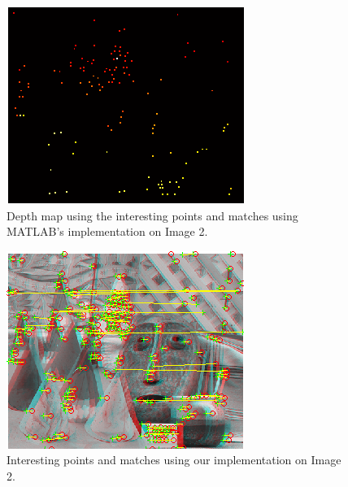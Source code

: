 \begin{figure}[H]\centering
	\includegraphics[width=0.8\linewidth]{Images/02_matlab_depth.png}
	\caption{Depth map using the interesting points and matches using MATLAB's implementation on Image 2.}
	\label{fig:grid-example}
\end{figure}

\begin{figure}[H]\centering
	\includegraphics[width=0.8\linewidth]{Images/02_our_match.png}
	\caption{Interesting points and matches using our implementation on Image 2.}
	\label{fig:grid-example}
\end{figure}

